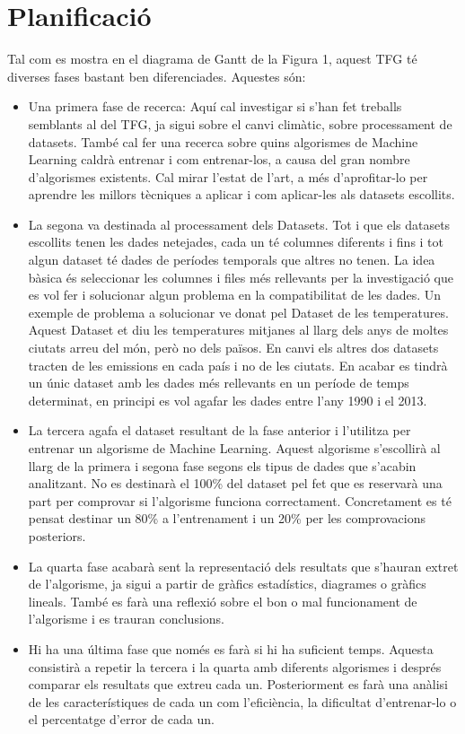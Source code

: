 \documentclass[10pt,a4paper,twocolumn,twoside]{article}
\begin{document}
\section{Planificació}
Tal com es mostra en el diagrama de Gantt de la Figura 1, aquest TFG té diverses fases bastant ben diferenciades. Aquestes són:
\begin{itemize}
\item Una primera fase de recerca: Aquí cal investigar si s'han fet treballs semblants al del TFG, ja sigui sobre el canvi climàtic, sobre processament de datasets. També cal fer una recerca sobre quins algorismes de Machine Learning caldrà entrenar i com entrenar-los, a causa del gran nombre d'algorismes existents. Cal mirar l'estat de l'art, a més d'aprofitar-lo per aprendre les millors tècniques a aplicar i com aplicar-les als datasets escollits.

\item La segona va destinada al processament dels Datasets. Tot i que els datasets escollits tenen les dades netejades, cada un té columnes diferents i fins i tot algun dataset té dades de períodes temporals que altres no tenen. La idea bàsica és seleccionar les columnes i files més rellevants per la investigació que es vol fer i solucionar algun problema en la compatibilitat de les dades. Un exemple de problema a solucionar ve donat pel Dataset de les temperatures. Aquest Dataset et diu les temperatures mitjanes al llarg dels anys de moltes ciutats arreu del món, però no dels països. En canvi els altres dos datasets tracten de les emissions en cada país i no de les ciutats. En acabar es tindrà un únic dataset amb les dades més rellevants en un període de temps determinat, en principi es vol agafar les dades entre l'any 1990 i el 2013.

\item La tercera agafa el dataset resultant de la fase anterior i l'utilitza per entrenar un algorisme de Machine Learning. Aquest algorisme s'escollirà al llarg de la primera i segona fase segons els tipus de dades que s'acabin analitzant. No es destinarà el 100\% del dataset pel fet que es reservarà una part per comprovar si l'algorisme funciona correctament. Concretament es té pensat destinar un 80\% a l'entrenament i un 20\%  per les comprovacions posteriors.

\item La quarta fase acabarà sent la representació dels resultats que s'hauran extret de l'algorisme, ja sigui a partir de gràfics estadístics, diagrames o gràfics lineals. També es farà una reflexió sobre el bon o mal funcionament de l'algorisme i es trauran conclusions.

\item Hi ha una última fase que només es farà si hi ha suficient temps. Aquesta consistirà a repetir la tercera i la quarta amb diferents algorismes i després comparar els resultats que extreu cada un. Posteriorment es farà una anàlisi de les característiques de cada un com l'eficiència, la dificultat d'entrenar-lo o el percentatge d'error de cada un.

\end{itemize}
\end{document}
